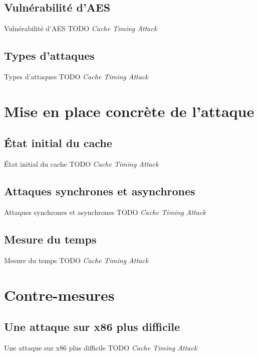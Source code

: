 \documentclass[11pt]{beamer}
\begin{document}
\subsection{Vulnérabilité d'AES}
\begin{frame}{Vulnérabilité d'AES}
TODO \emph{Cache Timing Attack} 
\end{frame}

\subsection{Types d'attaques}
\begin{frame}{Types d'attaques}
TODO \emph{Cache Timing Attack} 
\end{frame}

\section{Mise en place concrète de l'attaque}

\subsection{État initial du cache} 
\begin{frame}{État initial du cache}
TODO \emph{Cache Timing Attack} 
\end{frame}

\subsection{Attaques synchrones et asynchrones}
\begin{frame}{Attaques synchrones et asynchrones}
TODO \emph{Cache Timing Attack} 
\end{frame}

\subsection{Mesure du temps}
\begin{frame}{Mesure du temps}
TODO \emph{Cache Timing Attack} 
\end{frame}

\section{Contre-mesures}

\subsection{Une attaque sur x86 plus difficile}
\begin{frame}{Une attaque sur x86 plus difficile}
TODO \emph{Cache Timing Attack} 
\end{frame}
\end{document}
